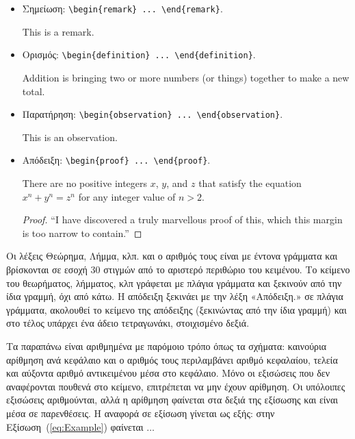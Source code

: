 \begin{itemize}
	\item Σημείωση: \verb|\begin{remark} ... \end{remark}|.

	\begin{remark}
		This is a remark.
	\end{remark}

	\item Ορισμός: \verb|\begin{definition} ... \end{definition}|.

	\begin{definition}
		Addition is bringing two or more numbers (or things) together to make 
		a new total.
	\end{definition}

	\item Παρατήρηση: \verb|\begin{observation} ... \end{observation}|.

	\begin{observation}
		This is an observation.
	\end{observation}

	\item Aπόδειξη: \verb|\begin{proof} ... \end{proof}|.

	\begin{theorem}
		There are no positive integers $x$, $y$, and $z$ that satisfy the 
		equation $x^{n} + y^{n} = z^{n}$ for any integer value of $n > 2$.
	\end{theorem}
	\begin{proof}
		``I have discovered a truly marvellous proof of this, which this margin 
		is too narrow to contain.''
	\end{proof}
\end{itemize}

Οι λέξεις Θεώρημα, Λήμμα, κλπ. και ο αριθμός τους είναι με έντονα γράμματα και βρίσκονται σε εσοχή 30 στιγμών από το αριστερό περιθώριο του κειμένου.
Το κείμενο του θεωρήματος, λήμματος, κλπ γράφεται με πλάγια γράμματα και ξεκινούν από την ίδια γραμμή, όχι από κάτω.
Η απόδειξη ξεκινάει με την λέξη «Απόδειξη.» σε πλάγια γράμματα, ακολουθεί το κείμενο της απόδειξης (ξεκινώντας από την ίδια γραμμή) και στο τέλος υπάρχει ένα άδειο τετραγωνάκι, στοιχισμένο δεξιά.

Τα παραπάνω είναι αριθμημένα με παρόμοιο τρόπο όπως τα σχήματα: καινούρια αρίθμηση ανά κεφάλαιο και ο αριθμός τους περιλαμβάνει αριθμό κεφαλαίου, τελεία και αύξοντα αριθμό αντικειμένου μέσα στο κεφάλαιο.
Μόνο οι εξισώσεις που δεν αναφέρονται πουθενά στο κείμενο, επιτρέπεται να μην έχουν αρίθμηση.
Οι υπόλοιπες εξισώσεις αριθμούνται, αλλά η αρίθμηση φαίνεται στα δεξιά της εξίσωσης και είναι μέσα σε παρενθέσεις.
Η αναφορά σε εξίσωση γίνεται ως εξής: στην Εξίσωση~(\ref{eq:Example}) φαίνεται $\ldots$

